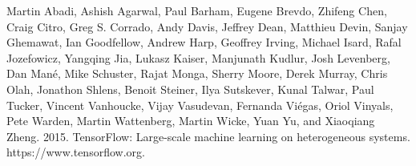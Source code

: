 \documentclass[letterpaper]{article} %
\begin{document}
\smallskip \noindent
Martin Abadi, Ashish Agarwal, Paul Barham, Eugene Brevdo, Zhifeng Chen, Craig Citro, Greg S. Corrado, Andy Davis, Jeffrey Dean, Matthieu Devin, Sanjay Ghemawat, Ian Goodfellow, Andrew Harp, Geoffrey Irving, Michael Isard, Rafal Jozefowicz, Yangqing Jia, Lukasz Kaiser, Manjunath Kudlur, Josh Levenberg, Dan Mané, Mike Schuster, Rajat Monga, Sherry Moore, Derek Murray, Chris Olah, Jonathon Shlens, Benoit Steiner, Ilya Sutskever, Kunal Talwar, Paul Tucker, Vincent Vanhoucke, Vijay Vasudevan, Fernanda Viégas, Oriol Vinyals, Pete Warden, Martin Wattenberg, Martin Wicke, Yuan Yu, and Xiaoqiang Zheng. 2015. TensorFlow: Large-scale machine learning on heterogeneous systems. https://www.tensorflow.org.
\end{document}
